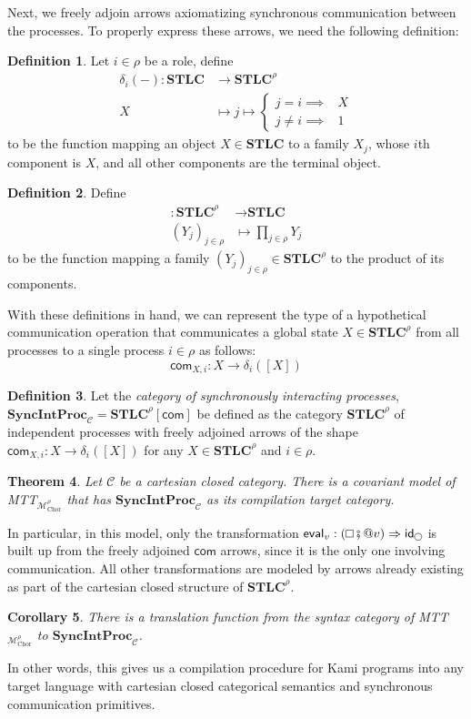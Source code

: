 \documentclass{scrartcl}
\theoremstyle{definition}
\newtheorem{definition}{Definition}
\theoremstyle{plain}
\newtheorem{theorem}[definition]{Theorem}
\newtheorem{corollary}[definition]{Corollary}
\renewcommand{\square}%
  {\tikz{\draw (0,0) rectangle (0.2cm,0.2cm);}}
\renewcommand{\circle}%
  {\tikz{\draw (0,0) circle [radius=0.1cm];}}
\begin{document}
Next, we freely adjoin arrows axiomatizing synchronous communication between
the processes. To properly express these arrows, we need the following
definition:
\begin{definition}
  Let $i\in\rho$ be a role, define
  \begin{align*}
    \delta_i({-}) : \textbf{STLC} &\to \textbf{STLC}^\rho \\
    X &\mapsto j \mapsto
    \begin{cases}
      j = i \implies &X\\
      j \neq i \implies &1
    \end{cases}
  \end{align*}
  to be the function mapping an object $X \in \textbf{STLC}$ to a family
  $X_j$, whose $i$th component is $X$, and all other components are the
  terminal object.
\end{definition}
\begin{definition} Define
  \begin{align*}
    [{-}] : \textbf{STLC}^\rho &\to \textbf{STLC} \\
    (Y_j)_{j\in\rho} &\mapsto \prod_{j \in \rho} Y_j
  \end{align*}
  to be the function mapping a family $(Y_j)_{j\in\rho} \in \textbf{STLC}^\rho$
  to the product of its components.
\end{definition}
With these definitions in hand, we can represent the type of a hypothetical
communication operation that communicates a global state $X \in
\textbf{STLC}^\rho$ from all processes to a single process $i \in \rho$ as
follows:
\[
  \textsf{com}_{X,i} : X \to \delta_i([X])
\]
\begin{definition}
  Let the \emph{category of synchronously interacting processes},
  $\textbf{SyncIntProc}_{\mathcal{C}} = \textbf{STLC}^\rho[\textsf{com}]$ be
  defined as the category $\textbf{STLC}^\rho$ of independent processes with
  freely adjoined arrows of the shape $\textsf{com}_{X,i} : X \to
  \delta_i([X])$ for any $X \in \textbf{STLC}^\rho$ and $i \in \rho$.
\end{definition}
\begin{theorem}
  Let $\mathcal{C}$ be a cartesian closed category. There is a covariant model
  of MTT${}_{\mathcal{M}^\rho_{\textrm{Chor}}}$ that has
  $\textbf{SyncIntProc}_{\mathcal{C}}$ as its compilation target category.
\end{theorem}
In particular, in this model, only the transformation $\textsf{eval}_v :
(\square \fatsemi {}@ v) \Rightarrow \textsf{id}_{\circle}$ is built up from
the freely adjoined $\textsf{com}$ arrows, since it is the only one involving
communication. All other transformations are modeled by arrows already existing
as part of the cartesian closed structure of $\textbf{STLC}^\rho$.
\begin{corollary}
  There is a translation function from the syntax category of
  MTT${}_{\mathcal{M}^\rho_{\textrm{Chor}}}$ to
  $\textbf{SyncIntProc}_{\mathcal{C}}$.
\end{corollary}
In other words, this gives us a compilation procedure for Kami programs into
any target language with cartesian closed categorical semantics and synchronous
communication primitives.
\end{document}
